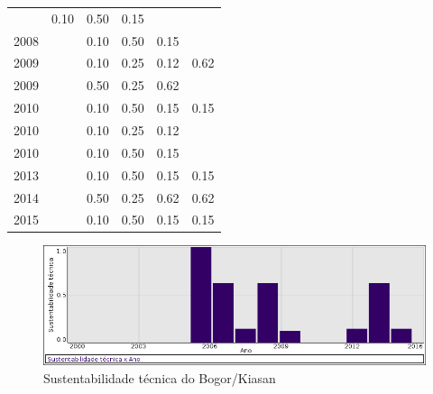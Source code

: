 \begin{table}[H]
\begin{tabular}{| l | c | c | c | c | c |}
          &
          0.10
          &
          0.50
          &
          0.15
          &
          \\
            2008
          &
          
          &
          0.10
          &
          0.50
          &
          0.15
          &
          \\
\hline
            2009
          &
          
          &
          0.10
          &
          0.25
          &
          0.12
          &
            {\color{blue} 0.62}
          \\
            2009
          &
          
          &
          0.50
          &
          0.25
          &
          0.62
          &
          \\
\hline
            2010
          &
          
          &
          0.10
          &
          0.50
          &
          0.15
          &
            {\color{red} 0.15}
          \\
            2010
          &
          
          &
          0.10
          &
          0.25
          &
          0.12
          &
          \\
            2010
          &
          
          &
          0.10
          &
          0.50
          &
          0.15
          &
          \\
\hline
            2013
          &
          
          &
          0.10
          &
          0.50
          &
          0.15
          &
            {\color{red} 0.15}
          \\
\hline
            2014
          &
          
          &
          0.50
          &
          0.25
          &
          0.62
          &
            {\color{blue} 0.62}
          \\
\hline
            2015
          &
          
          &
          0.10
          &
          0.50
          &
          0.15
          &
            {\color{red} 0.15}
          \\
\hline
\end{tabular}
\end{table}

\begin{figure}[h]
  \center
  \includegraphics[scale=0.50]{imagens/softwares-charts/kiasan.png}
  \caption{Sustentabilidade técnica do Bogor/Kiasan}
\end{figure}


